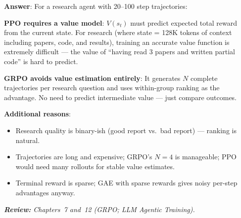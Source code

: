 \begin{questionbox}
\textbf{Answer}: For a research agent with 20--100 step trajectories:

\textbf{PPO requires a value model}: $V(s_t)$ must predict expected total reward from the current state. For research (where state = 128K tokens of context including papers, code, and results), training an accurate value function is extremely difficult --- the value of ``having read 3 papers and written partial code'' is hard to predict.

\textbf{GRPO avoids value estimation entirely}: It generates $N$ complete trajectories per research question and uses within-group ranking as the advantage. No need to predict intermediate value --- just compare outcomes.

\textbf{Additional reasons}:

\begin{itemize}
  \item Research quality is binary-ish (good report vs.~bad report) --- ranking is natural.
  \item Trajectories are long and expensive; GRPO’s $N=4$ is manageable; PPO would need many rollouts for stable value estimates.
  \item Terminal reward is sparse; GAE with sparse rewards gives noisy per-step advantages anyway.
\end{itemize}

\emph{\textbf{Review:} Chapters~7 and~12 (GRPO; LLM Agentic Training).}
\end{questionbox}

